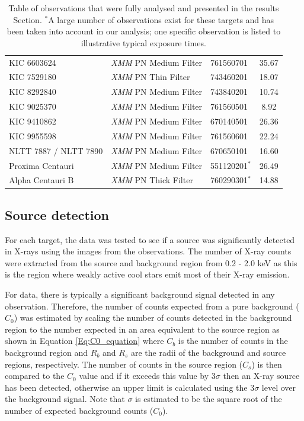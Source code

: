 \begin{table}[t]
{\begin{tabular}{lllc}
		KIC 6603624 & \textit{XMM} PN Medium Filter & 761560701 & 35.67 \\
		KIC 7529180  & \textit{XMM} PN Thin Filter & 743460201 & 18.07 \\
		KIC 8292840 & \textit{XMM} PN Medium Filter & 743840201 & 10.74 \\
		KIC 9025370 & \textit{XMM} PN Medium Filter & 761560501 & 8.92 \\
		KIC 9410862 & \textit{XMM} PN Medium Filter & 670140501 & 26.36\\
		KIC 9955598 & \textit{XMM} PN Medium Filter & 761560601 & 22.24 \\
		NLTT 7887 / NLTT 7890 & \textit{XMM} PN Medium Filter & 670650101 & 16.60  \\
		Proxima Centauri & \textit{XMM} PN Medium Filter & 551120201$^*$ & 26.49 \\
		Alpha Centauri B & \textit{XMM} PN Thick Filter & 760290301$^*$ & 14.88 \\     
		\hline
		\end{tabular}}
		\caption[List of X-ray observations used in study]{Table of observations that were fully analysed and presented in the results Section. $^*$A large number of observations exist for these targets and has been taken into account in our analysis; one specific observation is listed to illustrative typical exposure times.}
		\label{table:xray_obs_details}
\end{table}

\subsection{Source detection}
For each target, the data was tested to see if a source was significantly detected in X-rays using the images from the observations. The number of X-ray counts were extracted from the source and background region from 0.2 - 2.0 keV as this is the region where weakly active cool stars emit most of their X-ray emission.

For \XMM data, there is typically a significant background signal detected in any observation. Therefore, the number of counts expected from a pure background  ($C_{0}$) was estimated by scaling the number of counts detected in the background region to the number expected in an area equivalent to the source region as shown in Equation \ref{Eq:C0_equation} where $C_{b}$ is the number of counts in the background region and $R_{b}$ and $R_{s}$ are the radii of the background and source regions, respectively. The number of counts in the source region ($C_{s}$) is then compared to the $C_{0}$ value and if it exceeds this value by $3\sigma$ then an X-ray source has been detected, otherwise an upper limit is calculated using the $3\sigma$ level over the background signal. Note that $\sigma$ is estimated to be the square root of the number of expected background counts ($C_{0}$). 

